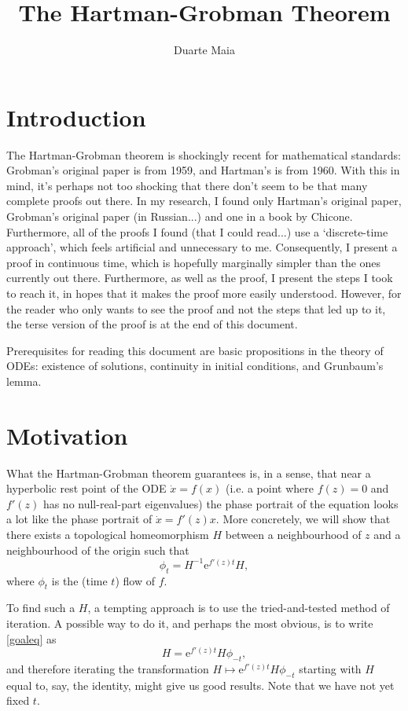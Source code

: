 \documentclass{article}
\title{The Hartman-Grobman Theorem}
\author{Duarte Maia}
\newcommand{\e}{\mathrm{e}}
\begin{document}
\maketitle

\section{Introduction}

The Hartman-Grobman theorem is shockingly recent for mathematical standards: Grobman's original paper is from 1959, and Hartman's is from 1960. With this in mind, it's perhaps not too shocking that there don't seem to be that many complete proofs out there. In my research, I found only Hartman's original paper, Grobman's original paper (in Russian...) and one in a book by Chicone. Furthermore, all of the proofs I found (that I could read...) use a `discrete-time approach', which feels artificial and unnecessary to me. Consequently, I present a proof in continuous time, which is hopefully marginally simpler than the ones currently out there. Furthermore, as well as the proof, I present the steps I took to reach it, in hopes that it makes the proof more easily understood. However, for the reader who only wants to see the proof and not the steps that led up to it, the terse version of the proof is at the end of this document.

Prerequisites for reading this document are basic propositions in the theory of ODEs: existence of solutions, continuity in initial conditions, and Grunbaum's lemma.

\section{Motivation}

What the Hartman-Grobman theorem guarantees is, in a sense, that near a hyperbolic rest point of the ODE $\dot x = f(x)$ (i.e. a point where $f(z) = 0$ and $f'(z)$ has no null-real-part eigenvalues) the phase portrait of the equation looks a lot like the phase portrait of $\dot x = f'(z) x$. More concretely, we will show that there exists a topological homeomorphism $H$ between a neighbourhood of $z$ and a neighbourhood of the origin such that
\begin{equation}\label{goaleq}
\phi_t = H^{-1} \e^{f'(z) t} H,
\end{equation}
where $\phi_t$ is the (time $t$) flow of $f$.

To find such a $H$, a tempting approach is to use the tried-and-tested method of iteration. A possible way to do it, and perhaps the most obvious, is to write \eqref{goaleq} as
\begin{equation}
H = \e^{f'(z) t} H \phi_{-t},
\end{equation}
and therefore iterating the transformation $H \mapsto \e^{f'(z) t} H \phi_{-t}$ starting with $H$ equal to, say, the identity, might give us good results. Note that we have not yet fixed $t$.
\end{document}
